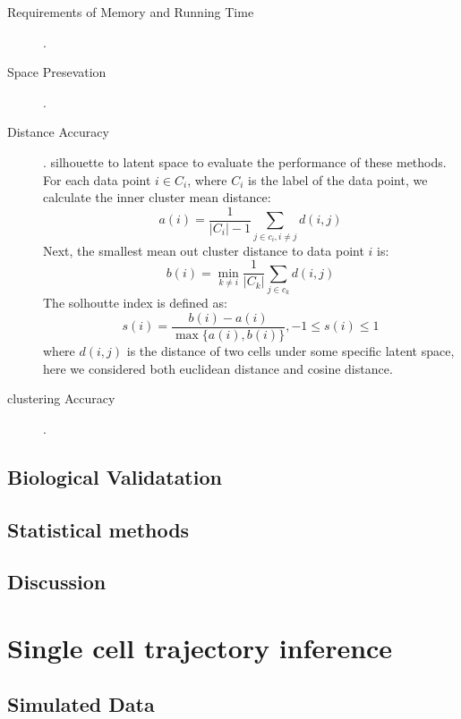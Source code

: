 \begin{description} %
	\item[Requirements of Memory and Running Time].
	\item[Space Presevation]. 
	\item[Distance Accuracy]. 
  silhouette to latent space to evaluate the performance of these methods. For each data point $i\in C_i$, where $C_i$ is the label of the data point, we calculate the inner cluster mean distance:
\begin{equation}
  a(i) = \frac{1}{|C_i| - 1} \underset{j \in c_i, i\neq j}{\sum} d(i, j)
\end{equation}
Next, the smallest mean out cluster distance to data point $i$ is:
\begin{equation}
b(i) = \underset{k\neq i}{\min}\frac{1}{|C_k|}\underset{j\in c_k}{\sum} d(i,j)
\end{equation}
The solhoutte index is defined as:
\begin{equation}
s(i)=\frac{b(i)-a(i)}{\max\{a(i), b(i)\}}, -1\leq s(i) \leq 1
\end{equation}
where $d(i,j)$ is the distance of two cells under some specific latent space, here we considered both euclidean distance and cosine distance.

	\item[clustering Accuracy]. 
\end{description}

\subsection{Biological Validatation}


\subsection{Statistical methods}
\subsection{Discussion}


\section{Single cell trajectory inference}

\subsection{Simulated Data}
